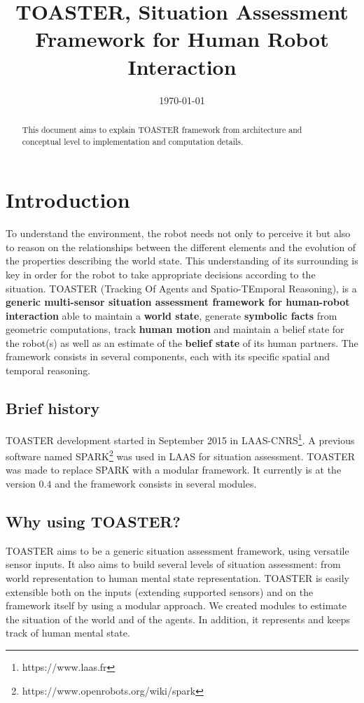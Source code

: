 \documentclass[a4paper]{article}
\title{TOASTER, Situation Assessment Framework for Human Robot Interaction}
\date{\today}
\begin{document}
\maketitle

\begin{abstract}
This document aims to explain TOASTER framework from architecture and conceptual level to implementation and computation details.
\end{abstract}

\tableofcontents

\section{Introduction}

To understand the environment, the robot needs not only to perceive it but also to reason on the relationships between the different elements and the evolution of the properties describing the world state. This understanding of its surrounding is key in order for the robot to take appropriate decisions according to the situation. TOASTER (Tracking Of Agents and Spatio-TEmporal Reasoning), is a \textbf{generic multi-sensor situation assessment framework for human-robot interaction} able to maintain a \textbf{world state}, generate \textbf{symbolic facts} from geometric computations, track \textbf{human motion} and maintain a belief state for the robot(s) as well as an estimate of the \textbf{belief state} of its human partners. The framework consists in several components, each with its specific spatial and temporal reasoning.

\subsection{Brief history}
TOASTER development started in September 2015 in LAAS-CNRS\footnote{https://www.laas.fr}.
A previous software named SPARK\footnote{https://www.openrobots.org/wiki/spark} \cite{Milliez2014}
was used in LAAS for situation assessment. TOASTER was made to replace SPARK with a modular framework.
It currently is at the version $0.4$ and the framework consists in several modules.

\subsection{Why using TOASTER?}
 
TOASTER aims to be a generic situation assessment framework, using versatile sensor inputs. It also aims to build several levels of situation assessment: from world representation to human mental state representation. TOASTER is easily extensible both on the inputs (extending supported sensors) and on the framework itself by using a modular approach. We created modules to estimate the situation of the world and of the agents. In addition, it represents and keeps track of human mental state.
\end{document}
